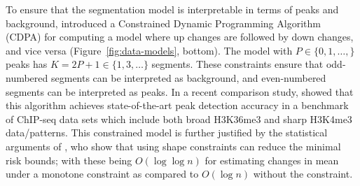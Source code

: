 \documentclass[twoside,11pt]{article}
\begin{document}
To ensure that the segmentation model is interpretable in terms of
peaks and background, \citet{HOCKING-PeakSeg} introduced a Constrained
Dynamic Programming Algorithm (CDPA) for computing a model where up changes are followed by down changes, and vice
versa (Figure~\ref{fig:data-models}, bottom). The model with
$P\in\{0,1,\dots, \}$ peaks has $K=2P+1\in\{1, 3, \dots\}$
segments. These constraints ensure that odd-numbered segments can be
interpreted as background, and even-numbered segments can be
interpreted as peaks.
In a recent comparison study, \citet{HOCKING2016-chipseq} showed that
this algorithm achieves state-of-the-art peak detection accuracy in a
benchmark of ChIP-seq data sets which include both broad
H3K36me3 and sharp H3K4me3 data/patterns. This constrained model is
further justified by the statistical arguments of
\citet{minimax-changepoint}, who show that using shape constraints can
reduce the minimal risk bounds; with these being $O(\log \log n)$ for
estimating changes in mean under a monotone constraint as compared to
$O(\log n)$ without the constraint.

\end{document}
